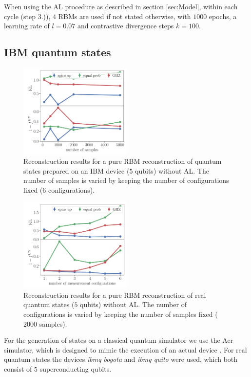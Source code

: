 \documentclass[pra,aps,showpacs,groupedaddress,superscriptaddress,twocolumn,toc=flat,biblatex,footinbib]{revtex4-1}
\begin{document}
When using the AL procedure as described in section \ref{sec:Model}, within each cycle (step 3.)), $4$ RBMs are used if not stated otherwise, with
$1000$ epochs, a learning rate of $l = 0.07$  and contrastive divergence steps $k = 100$.   

\subsection{IBM quantum states \label{appendix:IBM}}

\begin{figure}[htp]
	\centering
\includegraphics[width=0.5\textwidth]{Fig12.pdf}
	\caption[]{Reconstruction results for a pure RBM reconstruction of quantum states prepared on an IBM device ($5$ qubits) without AL. The number of samples is varied by keeping the number of configurations fixed ($6$ configurations).}
\label{fig:WithoutAL1}
\end{figure}
\begin{figure}[htp]
	\centering
\includegraphics[width=0.5\textwidth]{Fig13.pdf}
	\caption[]{Reconstruction results for a pure RBM reconstruction of real quantum states ($5$ qubits) without AL. The number of configurations is varied by keeping the number of samples fixed ($2000$ samples).}
\label{fig:WithoutAL2}
\end{figure}

For the generation of states on a classical quantum simulator we use the Aer simulator, which is designed to  mimic the execution of an actual device \cite{IBM}. For real quantum states the devices \textit{ibmq bogota} and \textit{ibmq quito} were used, which both consist of $5$ superconducting qubits. 
\end{document}
